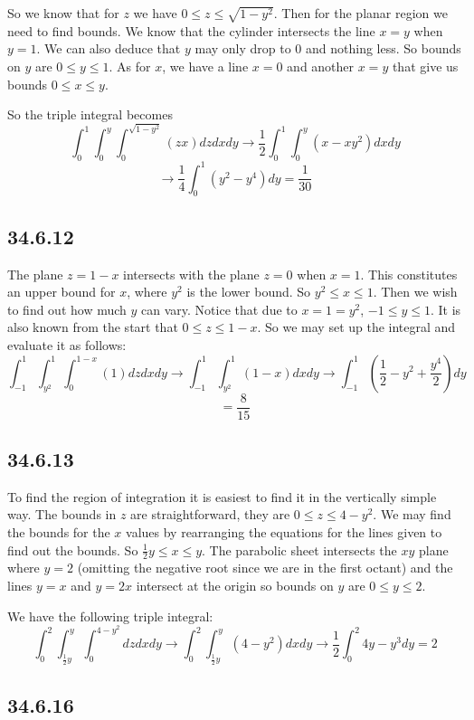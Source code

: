 \documentclass{article}
\begin{document}
So we know that for $z$ we have $0\leq z \leq \sqrt{1-y^2}$. Then for the planar region we need to find bounds. We know that the cylinder intersects the line $x = y$ when $y = 1$. We can also deduce that $y$ may only drop to $0$ and nothing less. So bounds on $y$ are $0\leq y \leq 1$. As for $x$, we have a line $x = 0$ and another $x = y$ that give us bounds $0\leq x \leq y$.

So the triple integral becomes $$\int_{0}^{1}\int_{0}^{y}\int_{0}^{\sqrt{1-y^2}}\left(zx\right)dzdxdy \to \frac{1}{2}\int_{0}^{1}\int_{0}^{y} \left(x-xy^2\right)dxdy$$
$$\to \frac{1}{4}\int_0^1 \left(y^2-y^4\right)dy = \frac{1}{30}$$

\subsection{34.6.12}

The plane $z=1-x$ intersects with the plane $z=0$ when $x = 1$. This constitutes an upper bound for $x$, where $y^2$ is the lower bound. So $y^2 \leq x \leq 1$. Then we wish to find out how much $y$ can vary. Notice that due to $x=1=y^2$, $-1\leq y \leq 1$. It is also known from the start that $0 \leq z \leq 1-x$. So we may set up the integral and evaluate it as follows:
$$\int_{-1}^{1}\int_{y^2}^{1}\int_{0}^{1-x} (1) dzdxdy \to \int_{-1}^{1}\int_{y^2}^{1} (1-x)dxdy \to \int_{-1}^{1} \left( \frac{1}{2}-y^2+\frac{y^4}{2}\right)dy$$
$$= \frac{8}{15}$$

\subsection{34.6.13}

To find the region of integration it is easiest to find it in the vertically simple way. The bounds in $z$ are straightforward, they are $0\leq z \leq 4-y^2$. We may find the bounds for the $x$ values by rearranging the equations for the lines given to find out the bounds. So $\frac{1}{2}y \leq x \leq y$. The parabolic sheet intersects the $xy$ plane where $y=2$ (omitting the negative root since we are in the first octant) and the lines $y = x$ and $y = 2x$ intersect at the origin so bounds on $y$ are $0\leq y \leq 2$.

We have the following triple integral:
$$\int_{0}^{2}\int_{\frac{1}{2}y}^{y}\int_{0}^{4-y^2}dzdxdy\to \int_{0}^{2}\int_{\frac{1}{2}y}^{y}(4-y^2)dxdy \to \frac{1}{2}\int_0^2 4y-y^3dy = 2$$

\subsection{34.6.16}
\end{document}
